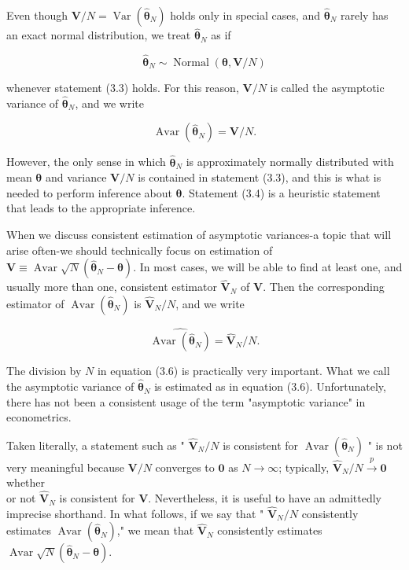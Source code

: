 \documentclass[10pt]{article}
\begin{document}
Even though $\mathbf{V} / N=\operatorname{Var}\left(\hat{\boldsymbol{\theta}}_{N}\right)$ holds only in special cases, and $\hat{\boldsymbol{\theta}}_{N}$ rarely has an exact normal distribution, we treat $\hat{\boldsymbol{\theta}}_{N}$ as if


\begin{equation*}
\hat{\boldsymbol{\theta}}_{N} \sim \operatorname{Normal}(\boldsymbol{\theta}, \mathbf{V} / N) \tag{3.4}
\end{equation*}


whenever statement (3.3) holds. For this reason, $\mathbf{V} / N$ is called the asymptotic variance of $\hat{\boldsymbol{\theta}}_{N}$, and we write


\begin{equation*}
\operatorname{Avar}\left(\hat{\boldsymbol{\theta}}_{N}\right)=\mathbf{V} / N . \tag{3.5}
\end{equation*}


However, the only sense in which $\hat{\boldsymbol{\theta}}_{N}$ is approximately normally distributed with mean $\boldsymbol{\theta}$ and variance $\mathbf{V} / N$ is contained in statement (3.3), and this is what is needed to perform inference about $\boldsymbol{\theta}$. Statement (3.4) is a heuristic statement that leads to the appropriate inference.

When we discuss consistent estimation of asymptotic variances-a topic that will arise often-we should technically focus on estimation of $\mathbf{V} \equiv \operatorname{Avar} \sqrt{N}\left(\hat{\boldsymbol{\theta}}_{N}-\boldsymbol{\theta}\right)$. In most cases, we will be able to find at least one, and usually more than one, consistent estimator $\hat{\mathbf{V}}_{N}$ of $\mathbf{V}$. Then the corresponding estimator of $\operatorname{Avar}\left(\hat{\boldsymbol{\theta}}_{N}\right)$ is $\hat{\mathbf{V}}_{N} / N$, and we write


\begin{equation*}
\widehat{\operatorname{Avar}\left(\hat{\boldsymbol{\theta}}_{N}\right)}=\hat{\mathbf{V}}_{N} / N . \tag{3.6}
\end{equation*}


The division by $N$ in equation (3.6) is practically very important. What we call the asymptotic variance of $\hat{\boldsymbol{\theta}}_{N}$ is estimated as in equation (3.6). Unfortunately, there has not been a consistent usage of the term "asymptotic variance" in econometrics.

Taken literally, a statement such as " $\hat{\mathbf{V}}_{N} / N$ is consistent for $\operatorname{Avar}\left(\hat{\boldsymbol{\theta}}_{N}\right)$ " is not very meaningful because $\mathbf{V} / N$ converges to $\mathbf{0}$ as $N \rightarrow \infty$; typically, $\hat{\mathbf{V}}_{N} / N \xrightarrow{p} \mathbf{0}$ whether\\
or not $\hat{\mathbf{V}}_{N}$ is consistent for $\mathbf{V}$. Nevertheless, it is useful to have an admittedly imprecise shorthand. In what follows, if we say that " $\hat{\mathbf{V}}_{N} / N$ consistently estimates $\operatorname{Avar}\left(\hat{\boldsymbol{\theta}}_{N}\right)$," we mean that $\hat{\mathbf{V}}_{N}$ consistently estimates $\operatorname{Avar} \sqrt{N}\left(\hat{\boldsymbol{\theta}}_{N}-\boldsymbol{\theta}\right)$.
\end{document}
